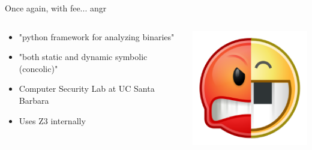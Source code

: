 \documentclass[10pt, compress]{beamer}
\begin{document}
\begin{frame}{Once again, with fee... angr}

	\begin{columns}
		\begin{column}{0.7\textwidth}
	
		\begin{itemize}
		\item "python framework for analyzing binaries"
		\item "both static and dynamic symbolic (concolic)"
		\item Computer Security Lab at UC Santa Barbara
		\item Uses Z3 internally
		\end{itemize}
	\end{column}
		\begin{column}{0.3\textwidth}
			\includegraphics[width=\textwidth]{images/angr-logo.png}
		\end{column}
	\end{columns}	

\end{frame}
\end{document}
